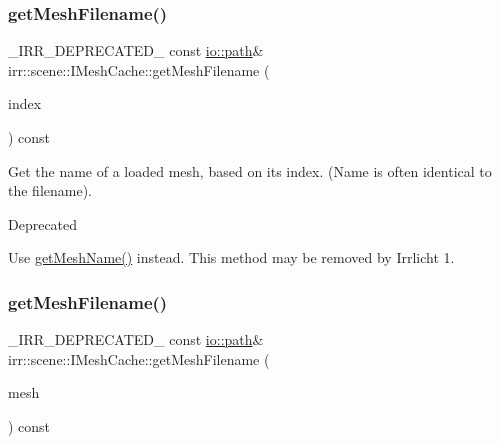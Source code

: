 \subsubsection{\texorpdfstring{get\+Mesh\+Filename()}{getMeshFilename()}\hspace{0.1cm}{\footnotesize\ttfamily [2/4]}}
{\footnotesize\ttfamily \+\_\+\+I\+R\+R\+\_\+\+D\+E\+P\+R\+E\+C\+A\+T\+E\+D\+\_\+ const \hyperlink{namespaceirr_1_1io_a6468281622ce3a1c46b72e19f32dded5}{io\+::path}\& irr\+::scene\+::\+I\+Mesh\+Cache\+::get\+Mesh\+Filename (\begin{DoxyParamCaption}\item[{\hyperlink{namespaceirr_a0416a53257075833e7002efd0a18e804}{u32}}]{index }\end{DoxyParamCaption}) const\hspace{0.3cm}{\ttfamily [inline]}}



Get the name of a loaded mesh, based on its index. (Name is often identical to the filename). 

\begin{DoxyRefDesc}{Deprecated}
\item[\hyperlink{deprecated__deprecated000010}{Deprecated}]Use \hyperlink{classirr_1_1scene_1_1IMeshCache_af06efb8fb21f6bba16e52d879b5d3ddd}{get\+Mesh\+Name()} instead. This method may be removed by Irrlicht 1. \end{DoxyRefDesc}
\mbox{\label{classirr_1_1scene_1_1IMeshCache_adc17a943cd79a94710def8dd7d2de605}} 
\subsubsection{\texorpdfstring{get\+Mesh\+Filename()}{getMeshFilename()}\hspace{0.1cm}{\footnotesize\ttfamily [3/4]}}
{\footnotesize\ttfamily \+\_\+\+I\+R\+R\+\_\+\+D\+E\+P\+R\+E\+C\+A\+T\+E\+D\+\_\+ const \hyperlink{namespaceirr_1_1io_a6468281622ce3a1c46b72e19f32dded5}{io\+::path}\& irr\+::scene\+::\+I\+Mesh\+Cache\+::get\+Mesh\+Filename (\begin{DoxyParamCaption}\item[{const \hyperlink{classirr_1_1scene_1_1IMesh}{I\+Mesh} $\ast$const}]{mesh }\end{DoxyParamCaption}) const\hspace{0.3cm}{\ttfamily [inline]}}



